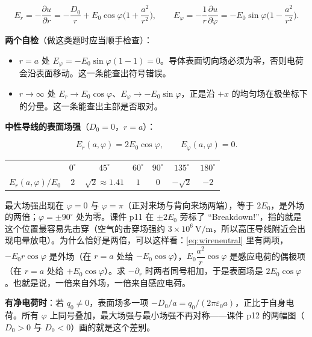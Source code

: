 \begin{equation}
E_r=-\frac{\partial u}{\partial r}=-\frac{D_0}{r}+E_0\cos\varphi\Big(1+\frac{a^2}{r^2}\Big),
\qquad
E_\varphi=-\frac1r\frac{\partial u}{\partial\varphi}=-E_0\sin\varphi\Big(1-\frac{a^2}{r^2}\Big).
\label{eq:wireEF}
\end{equation}

\textbf{两个自检}（做这类题时应当顺手检查）：

\begin{itemize}
  \item $r=a$ 处 $E_\varphi=-E_0\sin\varphi(1-1)=0$。导体表面切向场必须为零，否则电荷会沿表面移动。这一条能查出符号错误。
  \item $r\to\infty$ 处 $E_r\to E_0\cos\varphi$、$E_\varphi\to-E_0\sin\varphi$，正是沿 $+x$ 的均匀场在极坐标下的分量。这一条能查出主部是否取对。
\end{itemize}

\textbf{中性导线的表面场强}（$D_0=0$，$r=a$）：

\[
E_r(a,\varphi)=2E_0\cos\varphi,\qquad E_\varphi(a,\varphi)=0 .
\]

\begin{center}
\tabtop
\begin{tabular}{@{}lcccccc@{}}
\thead{$\varphi$} & $0^\circ$ & $45^\circ$ & $60^\circ$ & $90^\circ$ & $135^\circ$ & $180^\circ$ \\
\tabmidrule
$E_r(a,\varphi)/E_0$ & $2$ & $\sqrt2\approx1.41$ & $1$ & $0$ & $-\sqrt2$ & $-2$ \\
\end{tabular}
\tabbot
\end{center}

最大场强出现在 $\varphi=0$ 与 $\varphi=\pi$（正对来场与背向来场两端），等于 $2E_0$，是外场的两倍；$\varphi=\pm90^\circ$ 处为零。课件 p11 在 $\pm2E_0$ 旁标了 “Breakdown!”，指的就是这个位置最容易先击穿（空气的击穿场强约 $3\times10^6\ \mathrm{V/m}$，所以高压导线附近会出现电晕放电）。为什么恰好是两倍，可以这样看：\eqref{eq:wireneutral} 里有两项，$-E_0r\cos\varphi$ 是外场（在 $r=a$ 处给 $-E_0\cos\varphi$），$E_0\dfrac{a^2}{r}\cos\varphi$ 是感应电荷的偶极项（在 $r=a$ 处给 $+E_0\cos\varphi$）。求 $-\partial_r$ 时两者同号相加，于是表面场是 $2E_0\cos\varphi$。也就是说，一倍来自外场，一倍来自感应电荷。

\textbf{有净电荷时}：若 $q_0\ne0$，表面场多一项 $-D_0/a=q_0/(2\pi\varepsilon_0a)$，正比于自身电荷。所有 $\varphi$ 上同号叠加，最大场强与最小场强不再对称——课件 p12 的两幅图（$D_0>0$ 与 $D_0<0$）画的就是这个差别。

